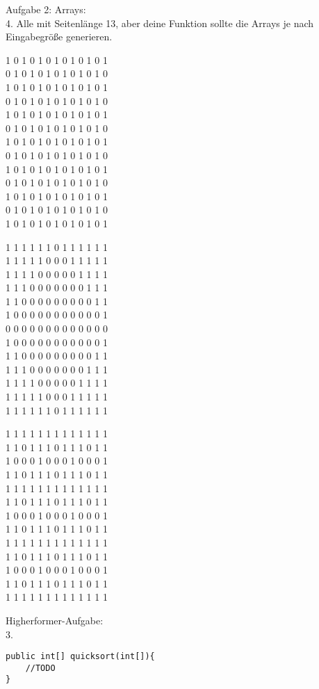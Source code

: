 \documentclass{../../sheet}
\begin{document}
\newpage
{}
Aufgabe 2: Arrays:\\
4. Alle mit Seitenlänge 13, aber deine Funktion sollte die Arrays je nach Eingabegröße generieren.
\begin{ausgabe}
1 0 1 0 1 0 1 0 1 0 1 0 1 \\
0 1 0 1 0 1 0 1 0 1 0 1 0 \\
1 0 1 0 1 0 1 0 1 0 1 0 1 \\
0 1 0 1 0 1 0 1 0 1 0 1 0 \\
1 0 1 0 1 0 1 0 1 0 1 0 1 \\
0 1 0 1 0 1 0 1 0 1 0 1 0 \\
1 0 1 0 1 0 1 0 1 0 1 0 1 \\
0 1 0 1 0 1 0 1 0 1 0 1 0 \\
1 0 1 0 1 0 1 0 1 0 1 0 1 \\
0 1 0 1 0 1 0 1 0 1 0 1 0 \\
1 0 1 0 1 0 1 0 1 0 1 0 1 \\
0 1 0 1 0 1 0 1 0 1 0 1 0 \\
1 0 1 0 1 0 1 0 1 0 1 0 1
\end{ausgabe}
\begin{ausgabe}
1 1 1 1 1 1 0 1 1 1 1 1 1 \\
1 1 1 1 1 0 0 0 1 1 1 1 1 \\
1 1 1 1 0 0 0 0 0 1 1 1 1 \\
1 1 1 0 0 0 0 0 0 0 1 1 1 \\
1 1 0 0 0 0 0 0 0 0 0 1 1 \\
1 0 0 0 0 0 0 0 0 0 0 0 1 \\
0 0 0 0 0 0 0 0 0 0 0 0 0 \\
1 0 0 0 0 0 0 0 0 0 0 0 1 \\
1 1 0 0 0 0 0 0 0 0 0 1 1 \\
1 1 1 0 0 0 0 0 0 0 1 1 1 \\
1 1 1 1 0 0 0 0 0 1 1 1 1 \\
1 1 1 1 1 0 0 0 1 1 1 1 1 \\
1 1 1 1 1 1 0 1 1 1 1 1 1
\end{ausgabe}
\begin{ausgabe}
1 1 1 1 1 1 1 1 1 1 1 1 1 \\
1 1 0 1 1 1 0 1 1 1 0 1 1 \\
1 0 0 0 1 0 0 0 1 0 0 0 1 \\
1 1 0 1 1 1 0 1 1 1 0 1 1 \\
1 1 1 1 1 1 1 1 1 1 1 1 1 \\
1 1 0 1 1 1 0 1 1 1 0 1 1 \\
1 0 0 0 1 0 0 0 1 0 0 0 1 \\
1 1 0 1 1 1 0 1 1 1 0 1 1 \\
1 1 1 1 1 1 1 1 1 1 1 1 1 \\
1 1 0 1 1 1 0 1 1 1 0 1 1 \\
1 0 0 0 1 0 0 0 1 0 0 0 1 \\
1 1 0 1 1 1 0 1 1 1 0 1 1 \\
1 1 1 1 1 1 1 1 1 1 1 1 1
\end{ausgabe}

Higherformer-Aufgabe:\\
3.
\begin{verbatim}
public int[] quicksort(int[]){
    //TODO
}
\end{verbatim}
\end{document}
